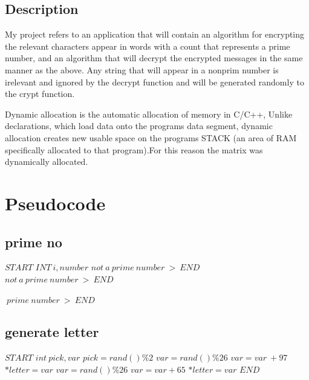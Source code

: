 \documentclass[12]{article}
\begin{document}
\subsection{Description}
\textcolor{white}{} 

My project refers to an application that will contain an algorithm for encrypting the relevant characters appear in words with a count that represents a prime number, and an algorithm that will decrypt the encrypted messages in the same manner as the above.  Any string that will appear in a nonprim number is irelevant and ignored by the decrypt function and will be generated randomly to the crypt function.

Dynamic allocation is the automatic allocation of memory in C/C++, Unlike declarations, which load data onto the programs data segment, dynamic allocation creates new usable space on the programs STACK (an area of RAM specifically allocated to that program).For this reason the matrix was dynamically allocated.








\newpage
\section{Pseudocode}


\subsection{prime no} 
\begin{algorithmic}[1] 
\STATE $START$
\STATE $INT \ i,number$ 
\STATE $not\ a\ prime\ number\ > \ END$
\ENDIF
{} 
    \STATE $not\ a \ prime\ number\ >\ END$
\ENDIF
\ENDFOR

\STATE $ \ prime\ number\ >\ END$


\end{algorithmic} 




\subsection{generate letter} 
\begin{algorithmic}[1] 
\STATE $START$ 
\STATE $int \ pick , var$ 
\STATE $pick = rand() \% 2 $ 
\STATE $var = rand() \% 26$ 
\STATE $var = var \ + 97$ 
\STATE $*letter = var$  
\ELSE 
\STATE  $var = rand() \% 26$ 
\STATE  $var = var + 65$ 
\STATE  $*letter = var$ 
\ENDIF  
\STATE $END$
\end{algorithmic}
\end{document}
